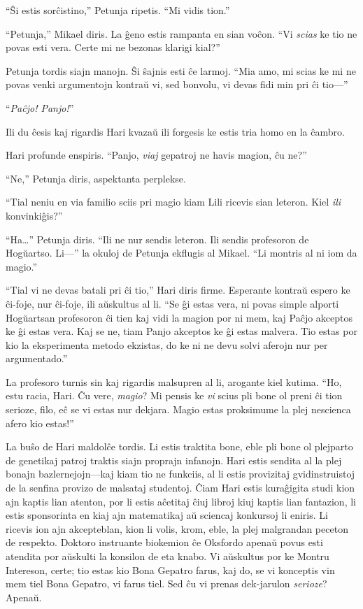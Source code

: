 “Ŝi estis sorĉistino,” Petunja ripetis.
“Mi vidis tion.”

“Petunja,” Mikael diris.
La ĝeno estis rampanta en sian voĉon.
“Vi \emph{scias} ke tio ne povas esti vera.
Certe mi ne bezonas klarigi kial?”

Petunja tordis siajn manojn.
Ŝi ŝajnis esti ĉe larmoj.
“Mia amo, mi scias ke mi ne povas venki argumentojn kontraŭ vi, sed bonvolu, vi devas fidi min pri ĉi tio—”

“\emph{Paĉjo! Panjo!}”

Ili du ĉesis kaj rigardis Hari kvazaŭ ili forgesis ke estis tria homo en la ĉambro.

Hari profunde enspiris.
“Panjo, \emph{viaj} gepatroj ne havis magion, ĉu ne?”

“Ne,” Petunja diris, aspektanta perplekse.

“Tial neniu en via familio sciis pri magio kiam Lili ricevis sian leteron.
Kiel \emph{ili} konvinkiĝis?”

“Ha…” Petunja diris.
“Ili ne nur sendis leteron.
Ili sendis profesoron de Hogŭartso.
Li—” la okuloj de Petunja ekflugis al Mikael.
“Li montris al ni iom da magio.”

“Tial vi ne devas batali pri ĉi tio,” Hari diris firme.
Esperante kontraŭ espero ke ĉi-foje, nur ĉi-foje, ili aŭskultus al li.
“Se ĝi estas vera, ni povas simple alporti Hogŭartsan profesoron ĉi tien kaj vidi la magion por ni mem, kaj Paĉjo akceptos ke ĝi estas vera.
Kaj se ne, tiam Panjo akceptos ke ĝi estas malvera.
Tio estas por kio la eksperimenta metodo ekzistas, do ke ni ne devu solvi aferojn nur per argumentado.”

La profesoro turnis sin kaj rigardis malsupren al li, arogante kiel kutima.
“Ho, estu racia, Hari.
Ĉu vere, \emph{magio}?
Mi pensis ke \emph{vi} scius pli bone ol preni ĉi tion serioze, filo, eĉ se vi estas nur dekjara.
Magio estas proksimume la plej nescienca afero kio estas!”

La buŝo de Hari maldolĉe tordis.
Li estis traktita bone, eble pli bone ol plejparto de genetikaj patroj traktis siajn proprajn infanojn.
Hari estis sendita al la plej bonajn bazlernejojn—kaj kiam tio ne funkciis, al li estis provizitaj gvidinstruistoj de la senfina provizo de malsataj studentoj.
Ĉiam Hari estis kuraĝigita studi kion ajn kaptis lian atenton, por li estis aĉetitaj ĉiuj libroj kiuj kaptis lian fantazion, li estis sponsorinta en kiaj ajn matematikaj aŭ sciencaj konkursoj li eniris.
Li ricevis ion ajn akcepteblan, kion li volis, krom, eble, la plej malgrandan peceton de respekto.
Doktoro instruante biokemion ĉe Oksfordo apenaŭ povus esti atendita por aŭskulti la konsilon de eta knabo.
Vi aŭskultus por ke Montru Intereson, certe; tio estas kio Bona Gepatro farus, kaj do, se vi konceptis vin mem tiel Bona Gepatro, vi farus tiel.
Sed ĉu vi prenas dek-jarulon \emph{serioze}?
Apenaŭ.

